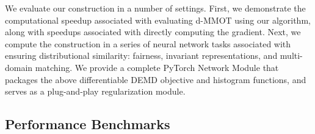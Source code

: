 We evaluate our construction in a number of settings. 
First, we demonstrate the computational speedup associated with evaluating d-MMOT using our algorithm, along with speedups associated with directly computing the gradient.
Next, we compute the construction in a series of neural network tasks associated with ensuring distributional similarity: fairness, invariant representations, and multi-domain matching.
We provide a complete PyTorch Network Module that packages the above differentiable DEMD objective and histogram functions,
and serves as a plug-and-play regularization module. %


\subsection{Performance Benchmarks}

